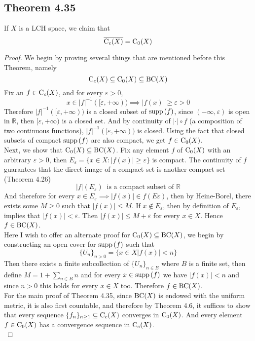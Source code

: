 \documentclass[../../main.tex]{subfiles}
\begin{document}
\subsection{Theorem 4.35}
\begin{wts}
If $X$ is a LCH space, we claim that
\[
\overline{\operatorname{C}_c({X})}=\operatorname{C}_0({X})
\]
\end{wts}
\begin{proof}
We begin by proving several things that are mentioned before this Theorem, namely
\[
\operatorname{C}_c({X})\subseteq\operatorname{C}_0({X})\subseteq\operatorname{BC}({X})
\]
Fix an $f\in \operatorname{C}_c({X})$, and for every $\varepsilon>0$, 
\[
x\in|f|^{-1}([\varepsilon,+\infty))\implies |f(x)|\geq\varepsilon>0
\]
Therefore $|f|^{-1}([\varepsilon,+\infty))$ is a closed subset of $\operatorname{supp}{(f)}$, since $(-\infty,\varepsilon)$ is open in $\mathbb{R}$, then $[\varepsilon,+\infty)$ is a closed set. And by continuity of $|\cdot|\circ f$ (a composition of two continuous functions), $|f|^{-1}([\varepsilon,+\infty))$ is closed. Using the fact that closed subsets of compact $\operatorname{supp}{(f)}$ are also compact, we get $f\in \operatorname{C}_0({X})$.\\

Next, we show that $\operatorname{C}_0({X})\subseteq \operatorname{BC}({X})$. Fix any element $f$ of $\operatorname{C}_0({X})$ with an arbitrary $\varepsilon>0$, then $E_\varepsilon = \{x\in X:|f(x)|\geq \varepsilon\}$ is compact. The continuity of $f$ guarantees that the direct image of a compact set is another compact set (Theorem 4.26)
\[
|f|(E_\varepsilon)\:\text{ is a compact subset of }\mathbb{R}
\]
And therefore for every $x\in E_\varepsilon\implies |f(x)|\in f(E\varepsilon)$, then by Heine-Borel, there exists some $M\geq 0$ such that $|f(x)|\leq M$. If $x\notin E_\varepsilon$, then by definition of $E_\varepsilon$, implies that $|f(x)|< \varepsilon$. Then $|f(x)|\leq M+\varepsilon$ for every $x\in X$. Hence $f\in\operatorname{BC}({X})$.\\

Here I wish to offer an alternate proof for $\operatorname{C}_0({X})\subseteq\operatorname{BC}({X})$, we begin by constructing an open cover for $\operatorname{supp}{(f)}$ such that
\[
\{U_n\}_{n>0} = \{x\in X |f(x)|<n\}
\]
Then there exists a finite subcollection of $\{U_n\}_{n\in B}$ where $B$ is a finite set, then define $M = 1+\sum_{n\in B}n$ and for every $x\in \operatorname{supp}{(f)}$ we have $|f(x)|<n$ and since $n>0$ this holds for every $x\in X$ too. Therefore $f\in \operatorname{BC}({X})$.\\

For the main proof of Theorem 4.35, since $\operatorname{BC}({X})$ is endowed with the uniform metric, it is also first countable, and therefore by Theorem 4.6, it suffices to show that every sequence $\{f_n\}_{n\geq 1}\subseteq \operatorname{C}_c({X})$ converges in $\operatorname{C}_0({X})$. And every element $f\in \operatorname{C}_0({X})$ has a convergence sequence in $\operatorname{C}_c({X})$.\\


\end{proof}
\end{document}
